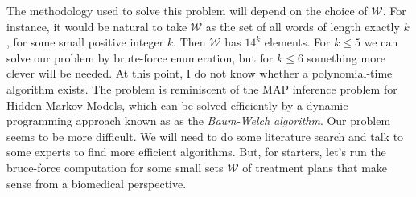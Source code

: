 \documentclass[12pt]{article}
\numberwithin{equation}{section}
\theoremstyle{plain}%
\numberwithin{theorem}{section}
\begin{document}
The methodology used to solve this problem will depend
on the choice of $\mathcal{W}$. For instance, it would be natural
to take $\mathcal{W}$ as the set of all words of length exactly $k$,
for some small positive integer $k$. Then
$\mathcal{W}$ has $14^k$ elements. For $k \leq 5$
we can solve our problem by brute-force enumeration, but
for $k \leq 6$ something more clever will be needed. 
At this point, I do not know whether a polynomial-time algorithm
exists. The problem is reminiscent of the MAP inference problem
for Hidden Markov Models, which can be solved efficiently
by a dynamic programming approach known as as the {\em Baum-Welch algorithm}.
Our problem seems to be more difficult. We will need to do some
literature search and talk to some experts to find more efficient algorithms.
But, for starters, let's run the bruce-force computation
for some small sets $\mathcal{W}$ of treatment plans
that make sense from a biomedical perspective.
\end{document}
